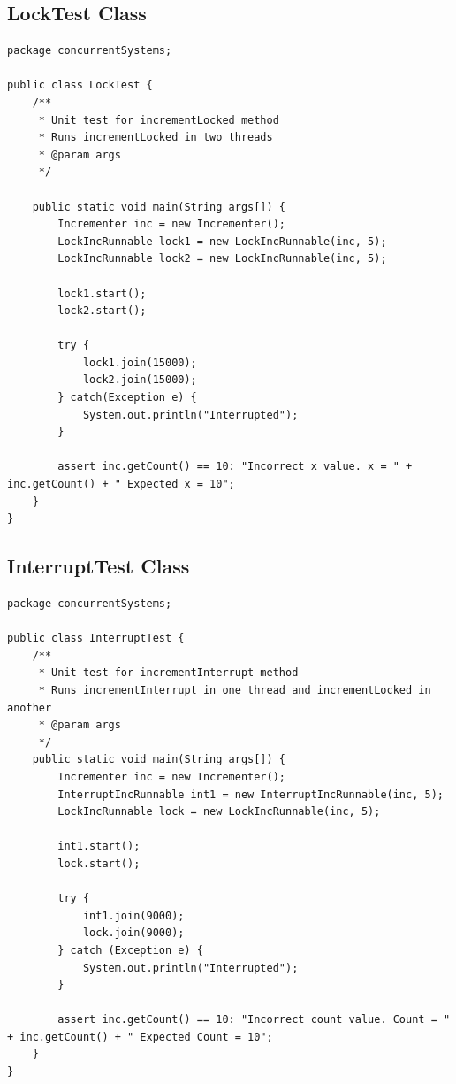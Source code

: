 \documentclass[a4paper,12pt]{article}
\begin{document}
\subsection{LockTest Class} \label{appendix:LockTest}

\begin{lstlisting}
package concurrentSystems;

public class LockTest {
    /**
     * Unit test for incrementLocked method
     * Runs incrementLocked in two threads
     * @param args
     */

    public static void main(String args[]) {
        Incrementer inc = new Incrementer();
        LockIncRunnable lock1 = new LockIncRunnable(inc, 5);
        LockIncRunnable lock2 = new LockIncRunnable(inc, 5);

        lock1.start();
        lock2.start();

        try {
            lock1.join(15000);
            lock2.join(15000);
        } catch(Exception e) {
            System.out.println("Interrupted");
        }

        assert inc.getCount() == 10: "Incorrect x value. x = " + inc.getCount() + " Expected x = 10";
    }
}
\end{lstlisting}

\subsection{InterruptTest Class} \label{appendix:InterruptTest}

\begin{lstlisting}
package concurrentSystems;

public class InterruptTest {
    /**
     * Unit test for incrementInterrupt method
     * Runs incrementInterrupt in one thread and incrementLocked in another
     * @param args
     */
    public static void main(String args[]) {
        Incrementer inc = new Incrementer();
        InterruptIncRunnable int1 = new InterruptIncRunnable(inc, 5);
        LockIncRunnable lock = new LockIncRunnable(inc, 5);

        int1.start();
        lock.start();

        try {
            int1.join(9000);
            lock.join(9000);
        } catch (Exception e) {
            System.out.println("Interrupted");
        }

        assert inc.getCount() == 10: "Incorrect count value. Count = " + inc.getCount() + " Expected Count = 10";
    }
}
\end{lstlisting}
\end{document}
